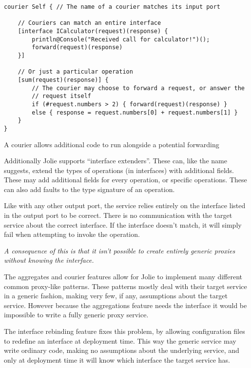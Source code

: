 \begin{listing}[H]
\begin{verbatim}
courier Self { // The name of a courier matches its input port

    // Couriers can match an entire interface
    [interface ICalculator(request)(response) {
        println@Console("Received call for calculator!")();
        forward(request)(response)
    }]

    // Or just a particular operation
    [sum(request)(response)] {
        // The courier may choose to forward a request, or answer the
        // request itself
        if (#request.numbers > 2) { forward(request)(response) }
        else { response = request.numbers[0] + request.numbers[1] }
    }
}
\end{verbatim}

\caption{A courier allows additional code to run alongside a potential
    forwarding}

\label{lst:simple_courier}

\end{listing}

Additionally Jolie supports ``interface extenders''. These can, like the name
suggests, extend the types of operations (in interfaces) with additional
fields. These may add additional fields for every operation, or specific
operations. These can also add faults to the type signature of an operation.

Like with any other output port, the service relies entirely on the interface
listed in the output port to be correct. There is no communication with the
target service about the correct interface. If the interface doesn't match, it
will simply fail when attempting to invoke the operation.

\emph{A consequence of this is that it isn't possible to create entirely generic
proxies without knowing the interface.}

The aggregates and courier features allow for Jolie to implement many different
common proxy-like patterns. These patterns mostly deal with their target
service in a generic fashion, making very few, if any, assumptions about the
target service. However because the aggregations feature needs the interface it
would be impossible to write a fully generic proxy service.

The interface rebinding feature fixes this problem, by allowing configuration
files to redefine an interface at deployment time. This way the generic service
may write ordinary code, making no assumptions about the underlying service,
and only at deployment time it will know which interface the target service
has.

